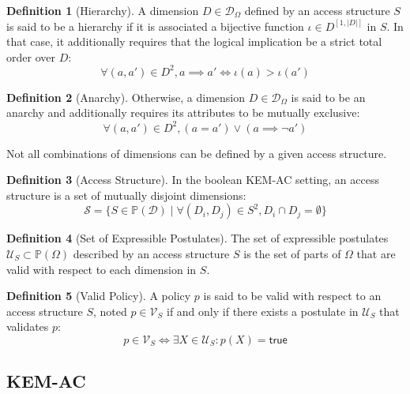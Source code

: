 \documentclass[a4paper]{article}
\theoremstyle{definition}
\newtheorem{definition}{Definition}[section]
\newcommand{\powerset}[1]{\mathbb P(#1)}
\newcommand{\cD}{\mathcal{D}}
\newcommand{\cS}{\mathcal{S}}
\newcommand{\cU}{\mathcal{U}}
\newcommand{\cV}{\mathcal{V}}
\newcommand{\true}{\mathsf{true}}
\begin{document}
\begin{definition}[Hierarchy]
A dimension \(D \in \cD_\Omega\) defined by  an access structure \(S\) is said to be
a hierarchy if it is associated  a bijective function \(\iota \in D^{[1,|D|]}\) in
\(S\).  In that  case, it additionally requires that the  logical implication be a
strict total order over \(D\):
\begin{equation}
  \tag{hierarchy}
  \forall (a, a') \in D^2, a  \implies a' \iff \iota(a) > \iota(a')
\end{equation}
\end{definition}

\begin{definition}[Anarchy]
Otherwise,  a  dimension  \(D \in  \cD_\Omega\)  is  said  to  be an  anarchy  and
additionally requires its attributes to be mutually exclusive:
\begin{equation}
  \tag{anarchy}
  \forall (a, a') \in D^2,
  \left( a = a' \right) \lor \left( a \implies \neg a' \right)
\end{equation}
\end{definition}

Not all combinations of dimensions can be defined by a given access structure.

\begin{definition}[Access Structure]
In the boolean KEM-AC setting, an access structure is a set of mutually disjoint
dimensions: \[ \cS = \{S \in \powerset{\cD} \mid \forall (D_i, D_j) \in S^2, D_i
\cap D_j = \emptyset \}\]
\end{definition}

\begin{definition}[Set of Expressible Postulates]
The set of expressible postulates \(\cU_S \subset \powerset{\Omega}\) described by
an access  structure \(S\) is  the set  of parts of  \(\Omega\) that are  valid with
respect to each dimension in \(S\).
\end{definition}

\begin{definition}[Valid Policy]
A policy \(p\) is said to be valid  with respect to an access structure \(S\), noted
\(p \in \cV_S\) if and only if  there exists a postulate in \(\cU_S\) that validates
\(p\): \[ p \in \cV_S \iff \exists X \in \cU_S : p(X) = \true \]
\end{definition}
\subsection{KEM-AC}
\label{sec:orga1fb084}
\end{document}

